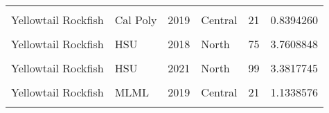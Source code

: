\documentclass[
]{article}
\begin{document}
\begin{longtable}[t]{llrlrr}
\cellcolor{gray!6}{Yellowtail Rockfish} & \cellcolor{gray!6}{Cal Poly} & \cellcolor{gray!6}{2018} & \cellcolor{gray!6}{Central} & \cellcolor{gray!6}{22} & \cellcolor{gray!6}{0.6041016}\\
Yellowtail Rockfish & Cal Poly & 2019 & Central & 21 & 0.8394260\\
\addlinespace
\cellcolor{gray!6}{Yellowtail Rockfish} & \cellcolor{gray!6}{Cal Poly} & \cellcolor{gray!6}{2021} & \cellcolor{gray!6}{Central} & \cellcolor{gray!6}{25} & \cellcolor{gray!6}{1.0818662}\\
Yellowtail Rockfish & HSU & 2018 & North & 75 & 3.7608848\\
\cellcolor{gray!6}{Yellowtail Rockfish} & \cellcolor{gray!6}{HSU} & \cellcolor{gray!6}{2019} & \cellcolor{gray!6}{North} & \cellcolor{gray!6}{20} & \cellcolor{gray!6}{1.5619528}\\
Yellowtail Rockfish & HSU & 2021 & North & 99 & 3.3817745\\
\cellcolor{gray!6}{Yellowtail Rockfish} & \cellcolor{gray!6}{MLML} & \cellcolor{gray!6}{2018} & \cellcolor{gray!6}{Central} & \cellcolor{gray!6}{23} & \cellcolor{gray!6}{0.8240977}\\
\addlinespace
Yellowtail Rockfish & MLML & 2019 & Central & 21 & 1.1338576\\
\cellcolor{gray!6}{Yellowtail Rockfish} & \cellcolor{gray!6}{MLML} & \cellcolor{gray!6}{2021} & \cellcolor{gray!6}{Central} & \cellcolor{gray!6}{60} & \cellcolor{gray!6}{1.7293645}\\*
\end{longtable}
\end{document}

